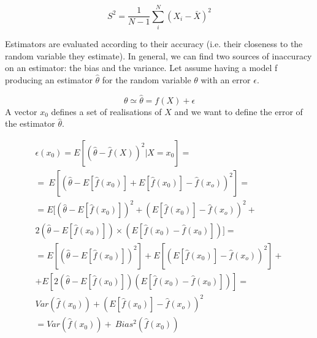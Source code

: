 \begin{equation}
S^2=\frac{1}{N-1}{\sum_{i}^{N}\left(X_i-\bar{X}\right)^2}
\label{eq_sampleVariance}
\end{equation}

Estimators are evaluated according to their accuracy (i.e. their closeness to the random variable they estimate). In general, we can find two sources of inaccuracy on an estimator: the bias and the variance. Let assume having a model f producing an estimator $\hat{\theta}$ for the random variable $\theta$ with an error $\epsilon$. 

\begin{equation}
\theta \simeq \hat{\theta}=f\left(X\right)+\epsilon
\label{eq_bias1}
\end{equation}
A vector $x_0$ defines a set of realisations of $X$ and we want to define the error of the estimator $\hat{\theta}$.

\begin{equation}
    \label{eq_bias2}
    \begin{split}
    \epsilon\left(x_0\right) = E\left[\left(\hat{\theta}-\hat{f}\left(X\right)\right)^2|X=x_0\right]= \\
     =\ E\left[\left(\hat{\theta}-E\left[\hat{f}\left(x_0\right)\right]+E\left[\hat{f}\left(x_0\right)\right]-\hat{f}\left(x_o\right)\right)^2\right]=\\
     = E[\left(\hat{\theta}-E\left[\hat{f}\left(x_0\right)\right]\right)^2 + \left(E\left[\hat{f}\left(x_0\right)\right]-\hat{f}\left(x_o\right)\right)^2 + \\ 2\left(\hat{\theta}-E\left[\hat{f}\left(x_0\right)\right]\right)\times \left(E\left[\hat{f}\left(x_0\right)-\hat{f}(x_0)\right]\right)]=\\
     =E\left[\left(\hat{\theta}-E\left[\hat{f}\left(x_0\right)\right]\right)^2\right] +E\left[\left(E\left[\hat{f}\left(x_0\right)\right]-\hat{f}\left(x_o\right)\right)^2\right] + \\
     + E\left[2\left(\hat{\theta}-E\left[\hat{f}\left(x_0\right)\right]\right)\left(E\left[\hat{f}\left(x_0\right)-\hat{f}\left(x_0\right)\right]\right)\right]=\\
     Var\left(\hat{f}\left(x_0\right)\right)+\left(E\left[\hat{f}\left(x_0\right)\right]-\hat{f}\left(x_o\right)\right)^2\\
     =Var\left(\hat{f}\left(x_0\right)\right)+\ Bias^2\left(\hat{f}\left(x_0\right)\right)\\
    \end{split}
\end{equation}


